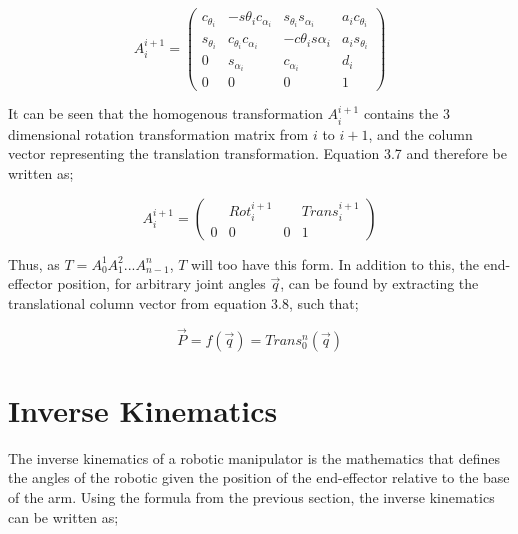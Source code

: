 \documentclass[12pt,openany,a4paper]{book}
\begin{document}
\vspace{\baselineskip}
\begin{equation}
A_{i}^{i+1} = 
\left(\begin{array}{cccc} c_{\theta_i} & -s{\theta_i} c_{\alpha_i} & s_{\theta_i} s_{\alpha_i} & a_i c_{\theta_i}\\ s_{\theta_i} & c_{\theta_i}c_{\alpha_i} & -c{\theta_i}s{\alpha_i} & a_i s_{\theta_i}\\ 0 & s_{\alpha_i} & c_{\alpha_i} & d_i\\ 0 & 0 & 0 & 1 \end{array}\right)
\end{equation}

\vspace{\baselineskip}

It can be seen that the homogenous transformation $A_{i}^{i+1}$ contains the 3 dimensional rotation transformation matrix from $i$ to $i+1$, and the column vector representing the translation transformation. Equation 3.7 and therefore be written as;

\vspace{\baselineskip}
\begin{equation}
A_{i}^{i+1} = 
 \left(\begin{array}{cccc} & Rot_{i}^{i+1} & & Trans_{i}^{i+1}  \\ 0 & 0 & 0 & 1 \end{array}\right)
\end{equation}

\vspace{\baselineskip}

Thus, as $T = A_{0}^{1} A_{1}^{2} ... A_{n-1}^n$, $T$ will too have this form. In addition to this, the end-effector position, for arbitrary joint angles $\vec{q}$, can be found by extracting the translational column vector from equation 3.8, such that;

\vspace{\baselineskip}
\begin{equation}
\vec{P} = f( \vec{q} ) = Trans_{0}^{n} (\vec{q})
\end{equation}

\section{Inverse Kinematics}
The inverse kinematics of a robotic manipulator is the mathematics that defines the angles of the robotic given the position of the end-effector relative to the base of the arm. Using the formula from the previous section, the inverse kinematics can be written as;
\end{document}

